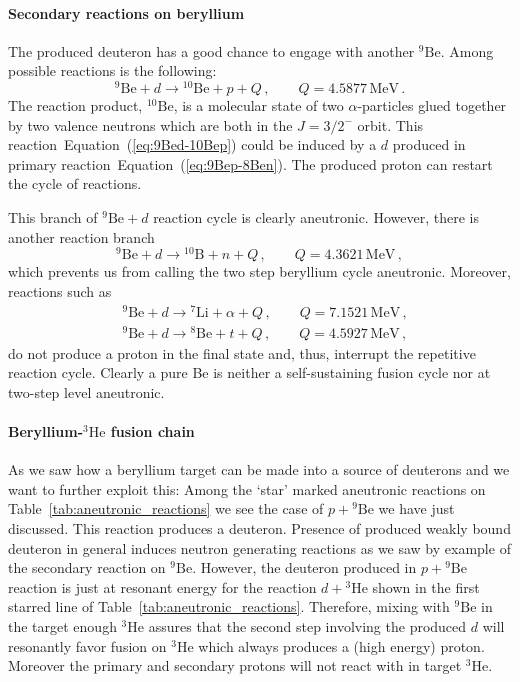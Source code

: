 \documentclass[particles,article,accept,pdftex,moreauthors]{Definitions/mdpi}
\newcommand{\req}[1]{Equation~(\ref{#1})}
\begin{document}
\paragraph*{\bf Secondary reactions on beryllium}
The produced deuteron has a good chance to engage with another ${}^9\mathrm{Be}$. Among possible reactions is the following:
\begin{equation}
{}^9\mathrm{Be}+d\to\! ^{10}\mathrm{Be}+p + Q \,,\qquad Q= 4.5877\,\mathrm{MeV}\,.
\label{eq:9Bed-10Bep}
\end{equation}
The reaction product, ${}^{10}\mathrm{Be}$,
is a molecular state of two $\alpha$-particles glued together by two valence neutrons which are both in the $J=3/2^-$ orbit. This reaction~\req{eq:9Bed-10Bep} could be induced by a $d$ produced in primary reaction~\req{eq:9Bep-8Ben}. The produced proton can restart the cycle of reactions. 

This branch of ${}^9\mathrm{Be}+d$ reaction cycle is clearly aneutronic. However, there is another reaction branch
\begin{equation}
{}^9\mathrm{Be}+d\to\! ^{10}\mathrm{B}+n + Q \,,\qquad Q= 4.3621\,\mathrm{MeV}\,,
\label{eq:9Bed-10Bn}
\end{equation}
which prevents us from calling the two step beryllium cycle aneutronic. Moreover, reactions such as 
\begin{align}
&{}^9\mathrm{Be}+d\to\! ^{7}\mathrm{Li}+\alpha + Q \,,\qquad Q= 7.1521\,\mathrm{MeV}\,,\\
&{}^9\mathrm{Be}+d\to\! ^{8}\mathrm{Be}+t + Q \,,\qquad Q= 4.5927\,\mathrm{MeV}\,,
\label{eq:9Bed-7Lia-8Bet}
\end{align}
do not produce a proton in the final state and, thus, interrupt the repetitive reaction cycle. Clearly a pure Be is neither a self-sustaining fusion cycle nor at two-step level aneutronic.


\paragraph*{\bf Beryllium-${}^{3}\mathrm{He}$ fusion chain}
As we saw how a beryllium target can be made into a source of deuterons and we want to further exploit this: Among the `star' marked aneutronic reactions on Table~\ref{tab:aneutronic_reactions} we see the case of $p + {}^9\mathrm{Be}$ we have just discussed. This reaction produces a deuteron. Presence of produced weakly bound deuteron in general induces neutron generating reactions as we saw by example of the secondary reaction on ${}^9\mathrm{Be}$. However, the deuteron produced in $p + {}^9\mathrm{Be}$ reaction is just at resonant energy for the reaction $d + {}^{3}\mathrm{He}$ shown in the first starred line of Table~\ref{tab:aneutronic_reactions}. Therefore, mixing with ${}^9\mathrm{Be}$ in the target enough ${}^{3}\mathrm{He}$ assures that the second step involving the produced $d$ will resonantly favor fusion on ${}^{3}\mathrm{He}$ which always produces a (high energy) proton. Moreover the primary and secondary protons will not react with in target ${}^{3}\mathrm{He}$.
\end{document}
